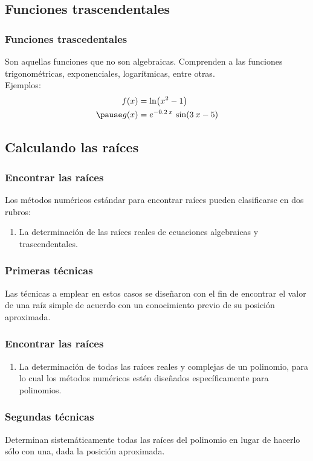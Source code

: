 \documentclass[12pt]{beamer}
\begin{document}
\subsection{Funciones trascendentales}

\begin{frame}
\frametitle{Funciones trascedentales}
Son aquellas funciones que no son algebraicas. \pause Comprenden a las funciones trigonométricas, exponenciales, logarítmicas, entre otras.
\\
\bigskip
\pause
Ejemplos:
\begin{eqnarray*}
\begin{aligned}
f (x) &= \ln(x^{2} - 1) \\ \pause
g (x) &= e^{-0.2 \: x} \, \sin(3 \: x - 5)
\end{aligned}
\end{eqnarray*}
\end{frame}

\subsection{Calculando las raíces}

\begin{frame}
\frametitle{Encontrar las raíces}
Los métodos numéricos estándar para encontrar raíces pueden clasificarse en dos rubros:
\pause
{}
\begin{enumerate}[<+->]
\item La determinación de las raíces reales de ecuaciones algebraicas y trascendentales.
\seti
\end{enumerate}
\end{frame}
\begin{frame}
\frametitle{Primeras técnicas}
Las técnicas a emplear en estos casos se diseñaron con el fin de encontrar el valor de una raíz simple de acuerdo con un conocimiento previo de su posición aproximada.
\end{frame}
\begin{frame}
\frametitle{Encontrar las raíces}
\begin{enumerate}[<+->]
\conti    
\item La determinación de todas las raíces reales y complejas de un polinomio, para lo cual los métodos numéricos estén diseñados específicamente para polinomios. 
\end{enumerate}
\end{frame}
\begin{frame}
\frametitle{Segundas técnicas}
Determinan sistemáticamente todas las raíces del polinomio en lugar de hacerlo sólo con una, dada la posición aproximada.
\end{frame}
\end{document}
